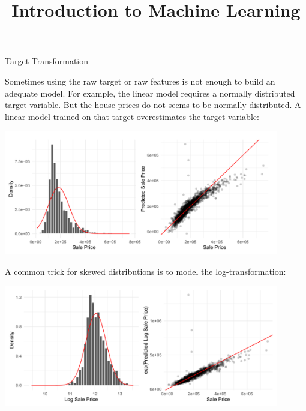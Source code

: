 



\newcommand{\titlefigure}{figure_man/automl2.png}
\newcommand{\learninggoals}{
  \item ...
  \item ...
}

\title{Introduction to Machine Learning}
\date{}





\begin{vbframe}{Target Transformation}
  
  Sometimes using the raw target or raw features is not enough to build an adequate model.
  For example, the linear model requires a normally distributed target variable.
  But the house prices do not seems to be normally distributed.
  A linear model trained on that target overestimates the target variable:
  
  
  \begin{center}
    \includegraphics[width=0.9\textwidth]{figure_man/target01.png}
  \end{center}
  
  
  \framebreak
  
  A common trick for skewed distributions is to model the log-transformation:
  
  
  \begin{center}
    \includegraphics[width=0.9\textwidth]{figure_man/target02.png}
  \end{center}
  

\end{vbframe}
